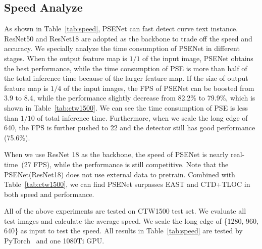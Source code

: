 \documentclass[10pt,twocolumn,letterpaper]{article}
\begin{document}
	\subsection{Speed Analyze}
	As shown in Table~\ref{tab:speed}, PSENet can fast detect curve text instance. ResNet50 and ResNet18 are adopted as the backbone to trade off the speed and accuracy. 
	We specially analyze the time consumption of PSENet in different stages. When the output feature map is $1/1$ of the input image, PSENet obtains the best performance, while the time consumption of PSE is more than half of the total inference time because of the larger feature map.
	If the size of output feature map is $1/4$ of the input images, the FPS of PSENet can be boosted from 3.9 to 8.4, while the performance slightly decrease from 82.2\% to 79.9\%, which is shown in Table~\ref{tab:ctw1500}. We can see the time consumption of PSE is less than $1/10$ of total inference time.
	Furthermore, when we scale the long edge of 640, the FPS is further pushed to 22 and the detector still has good performance (75.6\%).
	
	When we use ResNet 18 as the backbone, the speed of PSENet is nearly real-time~(27 FPS), while the performance is still competitive. 
	Note that the PSENet(ResNet18) does not use external data to pretrain.
	Combined with Table~\ref{tab:ctw1500}, we can find PSENet surpasses EAST and CTD+TLOC in both speed and performance.

	All of the above experiments are tested on CTW1500 test set. We evaluate all test images and calculate the average speed. We scale the long edge of \{1280, 960, 640\} as input to test the speed. All results in Table~\ref{tab:speed} are tested by PyTorch~\cite{pytorch} and one 1080Ti GPU. 
	
\end{document}
